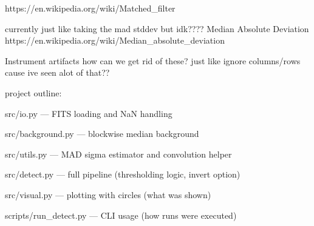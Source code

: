 \documentclass{article}
\begin{document}
https://en.wikipedia.org/wiki/Matched\_filter

currently just like taking the mad stddev but idk????
Median Absolute Deviation
https://en.wikipedia.org/wiki/Median\_absolute\_deviation



Instrument artifacts
how can we get rid of these?
just like ignore columns/rows cause ive seen alot of that??


project outline:

src/io.py — FITS loading and NaN handling

src/background.py — blockwise median background

src/utils.py — MAD sigma estimator and convolution helper

src/detect.py — full pipeline (thresholding logic, invert option)

src/visual.py — plotting with circles (what was shown)

scripts/run\_detect.py — CLI usage (how runs were executed)
\end{document}
